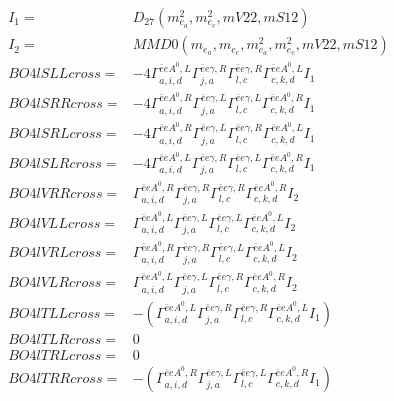 \documentclass[A4,landscape]{article}
\begin{document}
\begin{align} 
I_1 = & D_{27}(m^2_{e_{{a}}}, m^2_{e_{{c}}}, mV22, mS12) \\ 
I_2 = & MMD0(m_{e_{{a}}}, m_{e_{{c}}}, m^2_{e_{{a}}}, m^2_{e_{{c}}}, mV22, mS12) \\ 
  BO4lSLLcross= & -4  \Gamma^{\bar{e}e A^0 ,L}_{a, i, d} \Gamma^{\bar{e}e \gamma ,R}_{j, a} \Gamma^{\bar{e}e \gamma ,R}_{l, c} \Gamma^{\bar{e}e A^0 ,L}_{c, k, d} I_1 \\ 
  BO4lSRRcross= & -4  \Gamma^{\bar{e}e A^0 ,R}_{a, i, d} \Gamma^{\bar{e}e \gamma ,L}_{j, a} \Gamma^{\bar{e}e \gamma ,L}_{l, c} \Gamma^{\bar{e}e A^0 ,R}_{c, k, d} I_1 \\ 
  BO4lSRLcross= & -4  \Gamma^{\bar{e}e A^0 ,R}_{a, i, d} \Gamma^{\bar{e}e \gamma ,L}_{j, a} \Gamma^{\bar{e}e \gamma ,R}_{l, c} \Gamma^{\bar{e}e A^0 ,L}_{c, k, d} I_1 \\ 
  BO4lSLRcross= & -4  \Gamma^{\bar{e}e A^0 ,L}_{a, i, d} \Gamma^{\bar{e}e \gamma ,R}_{j, a} \Gamma^{\bar{e}e \gamma ,L}_{l, c} \Gamma^{\bar{e}e A^0 ,R}_{c, k, d} I_1 \\ 
  BO4lVRRcross= &  \Gamma^{\bar{e}e A^0 ,R}_{a, i, d} \Gamma^{\bar{e}e \gamma ,R}_{j, a} \Gamma^{\bar{e}e \gamma ,R}_{l, c} \Gamma^{\bar{e}e A^0 ,R}_{c, k, d} I_2 \\ 
  BO4lVLLcross= &  \Gamma^{\bar{e}e A^0 ,L}_{a, i, d} \Gamma^{\bar{e}e \gamma ,L}_{j, a} \Gamma^{\bar{e}e \gamma ,L}_{l, c} \Gamma^{\bar{e}e A^0 ,L}_{c, k, d} I_2 \\ 
  BO4lVRLcross= &  \Gamma^{\bar{e}e A^0 ,R}_{a, i, d} \Gamma^{\bar{e}e \gamma ,R}_{j, a} \Gamma^{\bar{e}e \gamma ,L}_{l, c} \Gamma^{\bar{e}e A^0 ,L}_{c, k, d} I_2 \\ 
  BO4lVLRcross= &  \Gamma^{\bar{e}e A^0 ,L}_{a, i, d} \Gamma^{\bar{e}e \gamma ,L}_{j, a} \Gamma^{\bar{e}e \gamma ,R}_{l, c} \Gamma^{\bar{e}e A^0 ,R}_{c, k, d} I_2 \\ 
  BO4lTLLcross= & -( \Gamma^{\bar{e}e A^0 ,L}_{a, i, d} \Gamma^{\bar{e}e \gamma ,R}_{j, a} \Gamma^{\bar{e}e \gamma ,R}_{l, c} \Gamma^{\bar{e}e A^0 ,L}_{c, k, d} I_1) \\ 
  BO4lTLRcross= & 0 \\ 
  BO4lTRLcross= & 0 \\ 
  BO4lTRRcross= & -( \Gamma^{\bar{e}e A^0 ,R}_{a, i, d} \Gamma^{\bar{e}e \gamma ,L}_{j, a} \Gamma^{\bar{e}e \gamma ,L}_{l, c} \Gamma^{\bar{e}e A^0 ,R}_{c, k, d} I_1) \\ 
\end{align} 
\end{document}

